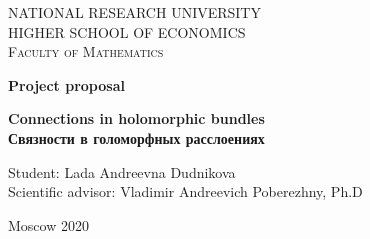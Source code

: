 \documentclass[11pt,a4paper,final,dvips]{article}
\begin{document}
\begin{center}
{\scshape NATIONAL RESEARCH UNIVERSITY \\
HIGHER SCHOOL OF ECONOMICS\\[1ex]
Faculty of Mathematics\par}

\par\vfill

\textbf{\large Project proposal}

\vspace{1.5cm}

{\Large\bfseries
Connections in holomorphic bundles\\
Связности в голоморфных расслоениях
\par}

\vspace{1.5cm}


\par\vfill
\noindent\hspace{0.52\textwidth}\parbox[t]{0.48\textwidth}{%
Student: Lada Andreevna Dudnikova\\[1ex]
Scientific advisor: Vladimir Andreevich Poberezhny, Ph.D
}%
\par\vfill
Moscow 2020
\end{center}
\thispagestyle{empty}
\pagebreak




\end{document}
